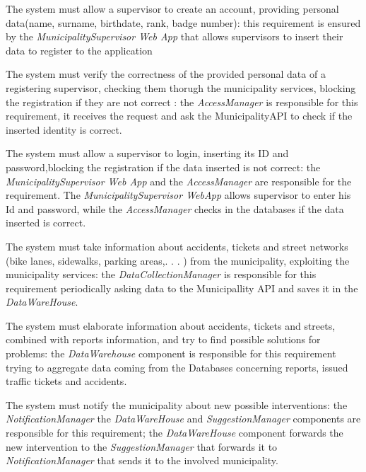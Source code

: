 \documentclass[a4paper]{report}
\begin{document}
\begin{enumerate}[start=1,label={[R\arabic*]}]
\item \label{[R38]}The system must allow a supervisor to create an account, providing personal data(name, surname, birthdate, rank, badge number): this requirement is ensured by  the\textit{ MunicipalitySupervisor Web App} that allows supervisors to insert their data to register to the application
\item \label{[R39]}The system must verify the correctness of the provided personal data of a registering supervisor, checking them thorugh the municipality services, blocking the registration if they are not correct : the \textit{AccessManager} is responsible for this requirement, it receives the request and ask the MunicipalityAPI to check if the inserted identity is correct.
\item \label{[R40]}The system must allow a supervisor to login, inserting its ID and password,blocking the registration if the data inserted is not correct: the \textit{MunicipalitySupervisor Web App} and the \textit{AccessManager} are responsible for the requirement. The \textit{MunicipalitySupervisor WebApp} allows supervisor to enter his Id and password, while the \textit{AccessManager} checks in the databases if the data inserted is correct.
\item \label{[R41]}The system must take information about accidents, tickets and street networks (bike lanes, sidewalks, parking areas,. . . ) from the municipality, exploiting the municipality services: the\textit{ DataCollectionManager} is responsible for this requirement periodically asking data to the Municipallity API and saves it in the \textit{DataWareHouse}.
\item \label{[R42]}The system must elaborate information about accidents, tickets and streets, combined with reports information, and try to find possible solutions for problems: the \textit{DataWarehouse} component is responsible for this requirement trying to aggregate data coming from the Databases concerning reports, issued traffic tickets and accidents.
\item \label{[R43]}The system must notify the municipality about new possible interventions: the \textit{NotificationManager} the \textit{DataWareHouse} and \textit{SuggestionManager} components are responsible for this requirement; the \textit{DataWareHouse} component forwards the new intervention to the \textit{SuggestionManager} that forwards it to \textit{NotificationManager} that sends it to  the involved municipality.

\end{enumerate}
\end{document}
